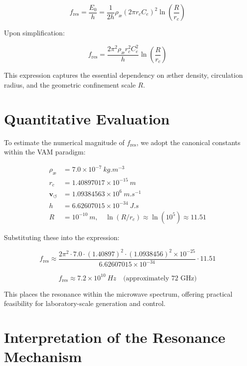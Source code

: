 \documentclass[a4paper, aps,preprint,superscriptaddress, 12pt]{revtex4}
\begin{document}
\begin{equation}
f_\text{res} = \frac{E_0}{h} = \frac{1}{2h} \rho_\text{\ae} (2\pi r_c C_e)^2 \ln\left(\frac{R}{r_c}\right)
\end{equation}

Upon simplification:

\begin{equation}
f_\text{res} = \frac{2\pi^2 \rho_\text{\ae} r_c^2 C_e^2}{h} \ln\left(\frac{R}{r_c}\right)
\end{equation}

This expression captures the essential dependency on \ae{}ther density, circulation radius, and the geometric confinement scale $R$.

\section{Quantitative Evaluation}

To estimate the numerical magnitude of $f_\text{res}$, we adopt the canonical constants within the VAM paradigm:

\begin{align*}
    \rho_\text{\ae} &= 7.0 \times 10^{-7}\ \si{kg.m^{-3}} \\
    r_c &= 1.40897017 \times 10^{-15}\ \si{m} \\
    \mathbf{v}_{\scriptscriptstyle\boldsymbol{\circlearrowleft}} &= 1.09384563 \times 10^6\ \si{m.s^{-1}} \\
    h &= 6.62607015 \times 10^{-34}\ \si{J.s} \\
R &= 10^{-10}\ \si{m}, \quad \ln(R/r_c) \approx \ln(10^5) \approx 11.51
\end{align*}

Substituting these into the expression:

\begin{equation}
f_\text{res} \approx \frac{2\pi^2 \cdot 7.0 \cdot (1.40897)^2 \cdot (1.0938456)^2 \times 10^{-25}}{6.62607015 \times 10^{-34}} \cdot 11.51
\end{equation}

\begin{equation}
f_\text{res} \approx 7.2 \times 10^{10}\ \si{Hz} \quad \text{(approximately 72 GHz)}
\end{equation}

This places the resonance within the microwave spectrum, offering practical feasibility for laboratory-scale generation and control.

\section{Interpretation of the Resonance Mechanism}
\end{document}
